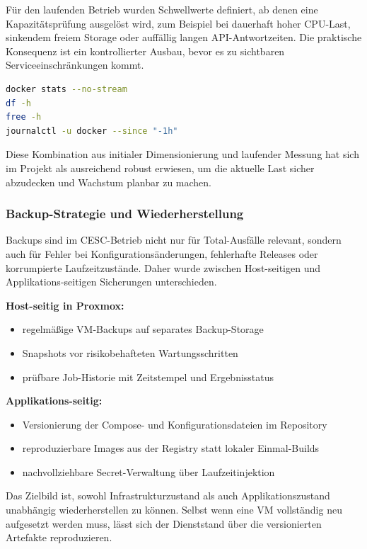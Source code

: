 Für den laufenden Betrieb wurden Schwellwerte definiert, ab denen eine Kapazitätsprüfung ausgelöst wird, zum Beispiel bei dauerhaft hoher CPU-Last, sinkendem freiem Storage oder auffällig langen API-Antwortzeiten. Die praktische Konsequenz ist ein kontrollierter Ausbau, bevor es zu sichtbaren Serviceeinschränkungen kommt.

\begin{lstlisting}[language=bash,caption={Typische Betriebsprüfungen auf der Applikations-VM},label={lst:proxmox_runtime_checks},basicstyle=\ttfamily\small]
docker stats --no-stream
df -h
free -h
journalctl -u docker --since "-1h"
\end{lstlisting}

Diese Kombination aus initialer Dimensionierung und laufender Messung hat sich im Projekt als ausreichend robust erwiesen, um die aktuelle Last sicher abzudecken und Wachstum planbar zu machen.

\subsubsection{Backup-Strategie und Wiederherstellung}

Backups sind im CESC-Betrieb nicht nur für Total-Ausfälle relevant, sondern auch für Fehler bei Konfigurationsänderungen, fehlerhafte Releases oder korrumpierte Laufzeitzustände. Daher wurde zwischen Host-seitigen und Applikations-seitigen Sicherungen unterschieden.

\textbf{Host-seitig in Proxmox:}
\begin{itemize}
    \item regelmäßige VM-Backups auf separates Backup-Storage
    \item Snapshots vor risikobehafteten Wartungsschritten
    \item prüfbare Job-Historie mit Zeitstempel und Ergebnisstatus
\end{itemize}

\textbf{Applikations-seitig:}
\begin{itemize}
    \item Versionierung der Compose- und Konfigurationsdateien im Repository
    \item reproduzierbare Images aus der Registry statt lokaler Einmal-Builds
    \item nachvollziehbare Secret-Verwaltung über Laufzeitinjektion
\end{itemize}

Das Zielbild ist, sowohl Infrastrukturzustand als auch Applikationszustand unabhängig wiederherstellen zu können. Selbst wenn eine VM vollständig neu aufgesetzt werden muss, lässt sich der Dienststand über die versionierten Artefakte reproduzieren.

